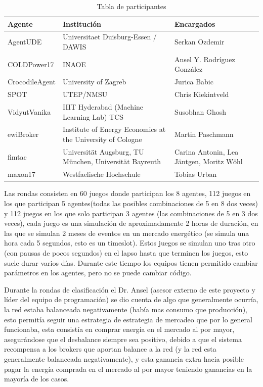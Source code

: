 \begin{table}[h!]
	\centering
	\begin{tabular}{|p{2.76cm}|p{8cm}|p{5.4cm}|} \hline
		\textbf{Agente}	 		& \textbf{Institución} 			& \textbf{Encargados} \\\hline	
	    AgentUDE	 	& Universitaet Duisburg-Essen / DAWIS 	& Serkan Ozdemir \\\hline	
    	COLDPower17		& INAOE									& Ansel Y. Rodríguez González\\\hline	
	    CrocodileAgent	& University of Zagreb					& Jurica Babic	\\\hline	
	    SPOT			& UTEP/NMSU								& Chris Kiekintveld\\\hline	
	    VidyutVanika	& IIIT Hyderabad (Machine Learning Lab) TCS & Susobhan Ghosh\\\hline	
	    ewiBroker		& Institute of Energy Economics at the University of Cologne & Martin Paschmann\\\hline	
    	fimtac			& Universität Augsburg, TU München, Universität Bayreuth& Carina Antonin, Lea Jäntgen, Moritz Wöhl\\\hline	
	    maxon17			& Westfaelische Hochschule				& Tobias Urban \\\hline
	\end{tabular}
\caption{Tabla de participantes}
\end{table}

Las rondas consisten en 60 juegos donde participan los 8 agentes, 112 juegos en los que participan 5 agentes(todas las posibles combinaciones de 5 en 8 dos veces) y 112 juegos en los que solo participan 3 agentes (las combinaciones de 5 en 3 dos veces), cada juego es una simulación de aproximadamente 2 horas de duración, en las que se simulan 2 meses de eventos en un mercado energético (se simula una hora cada 5 segundos, esto es un timeslot). Estos juegos se simulan uno tras otro (con pausas de pocos segundos) en el lapso hasta que terminen los juegos, esto suele durar varios días. Durante este tiempo los equipos tienen permitido cambiar parámetros en los agentes, pero no se puede cambiar código. 

Durante la rondas de clasificación 
el Dr. Ansel (asesor externo de este proyecto y líder del equipo de programación) se dio cuenta de algo que generalmente ocurría, la red estaba balanceada negativamente (había mas consumo que producción), esto permitía seguir una estrategia de estrategia de mercadeo que por lo general funcionaba, esta consistía en comprar energía en el mercado al por mayor, asegurándose que el desbalance siempre sea positivo, debido a que el sistema recompensa a los brokers que aportan balance a la red (y la red esta generalmente balanceada negativamente), y esta ganancia extra hacia posible pagar la energía comprada en el mercado al por mayor teniendo ganancias en la mayoría de los casos.

